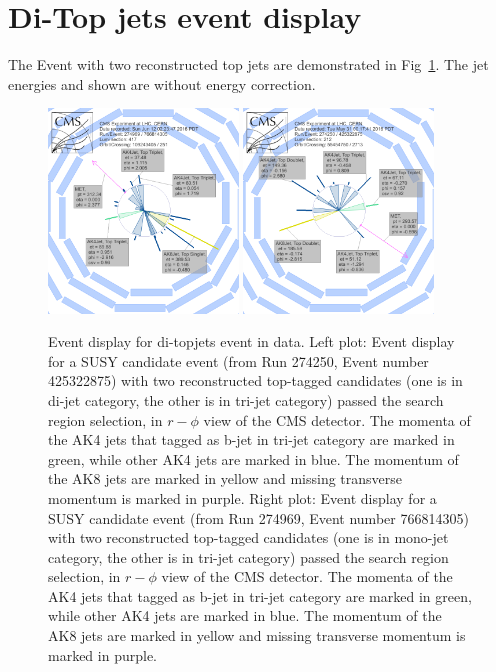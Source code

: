 \section{Di-Top jets event display}
The Event with two reconstructed top jets are demonstrated in Fig~\ref{fig:appttevtdisplay}. The jet energies and \MET shown are without energy correction.
\begin{figure}[htbp]
 \begin{center}
  \includegraphics[width=0.45\textwidth]{figures/appendix/Run2016B_1j3j-274969_766814305_417_RhoPhi.png}
  \includegraphics[width=0.45\textwidth]{figures/appendix/Run2016B_2j3j-274250_425322875_212_RhoPhi.png}
 \end{center} 
 \caption{Event display for di-topjets event in data. Left plot: Event display for a SUSY candidate event (from Run 274250, Event number 425322875) with two reconstructed top-tagged candidates (one is in di-jet category, the other is in tri-jet category) passed the search region selection, in $r-\phi$ view of the CMS detector. The momenta of the AK4 jets that tagged as b-jet in tri-jet category are marked in green, while other AK4 jets are marked in blue. The momentum of the AK8 jets are marked in yellow and missing transverse momentum is marked in purple. Right plot: Event display for a SUSY candidate event (from Run 274969, Event number 766814305) with two reconstructed top-tagged candidates (one is in mono-jet category, the other is in tri-jet category) passed the search region selection, in $r-\phi$ view of the CMS detector. The momenta of the AK4 jets that tagged as b-jet in tri-jet category are marked in green, while other AK4 jets are marked in blue. The momentum of the AK8 jets are marked in yellow and missing transverse momentum is marked in purple.
}
 \label{fig:appttevtdisplay}
\end{figure}

